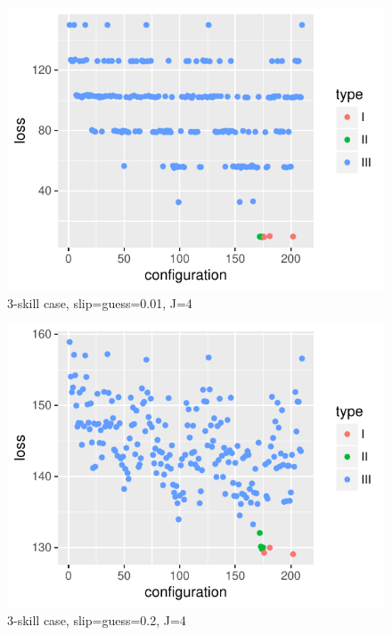 \documentclass{edm_template}
\begin{document}
\begin{figure}[h!]
  \begin{center}
  \includegraphics[width=\columnwidth]{simResults/LossBestConfig_theta001_J4.pdf}
  \end{center}
  \caption{3-skill case, slip=guess=0.01, J=4}  
  \label{fig:theta001J4ThreeSkill}
\end{figure}

\begin{figure}[h!]
  \begin{center}
  \includegraphics[width=\columnwidth]{simResults/LossBestConfig_theta02_J4.pdf}
  \end{center}
  \caption{3-skill case, slip=guess=0.2, J=4}  
  \label{fig:theta021J4ThreeSkill}
\end{figure}
\end{document}
